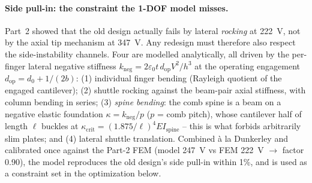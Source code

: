 \paragraph{Side pull-in: the constraint the 1-DOF model misses.}
Part~2 showed that the old design actually fails by lateral \emph{rocking} at
\SI{222}{\volt}, not by the axial tip mechanism at \SI{347}{\volt}. Any
redesign must therefore also respect the side-instability channels. Four are
modelled analytically, all driven by the per-finger lateral negative
stiffness $k_{\mathrm{neg}}=2\varepsilon_{0}t\,d_{\mathrm{op}}V^{2}/h^{3}$
at the operating engagement $d_{\mathrm{op}}=d_{0}+1/(2b)$:
(1) individual finger bending (Rayleigh quotient of the engaged cantilever);
(2) shuttle rocking against the beam-pair axial stiffness, with column
bending in series; (3) \emph{spine bending}: the comb spine is a beam on a
negative elastic foundation $\kappa=k_{\mathrm{neg}}/p$ ($p$ = comb pitch),
whose cantilever half of length $\ell$ buckles at
$\kappa_{\mathrm{crit}}=(1.875/\ell)^{4}EI_{\mathrm{spine}}$ -- this is what
forbids arbitrarily slim plates; and (4) lateral shuttle translation.
Combined \`a la Dunkerley and calibrated once against the Part-2 FEM (model
\SI{247}{\volt} vs FEM \SI{222}{\volt} $\to$ factor 0.90), the model
reproduces the old design's side pull-in within 1\%, and is used as a
constraint set in the optimization below.
